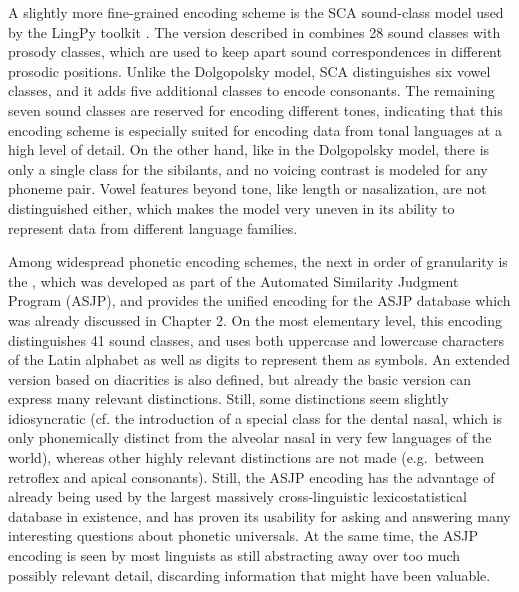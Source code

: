 A slightly more fine-grained encoding scheme is the SCA sound-class model used by the LingPy toolkit \citep{list_forkel_2016}. The version described in \cite{list2012sca} combines 28 sound classes with prosody classes, which are used to keep apart sound correspondences in different prosodic positions. Unlike the Dolgopolsky model, SCA distinguishes six vowel classes, and it adds five additional classes to encode consonants. The remaining seven sound classes are reserved for encoding different tones, indicating that this encoding scheme is especially suited for encoding data from tonal languages at a high level of detail. On the other hand, like in the Dolgopolsky model, there is only a single class for the sibilants, and no voicing contrast is modeled for any phoneme pair. Vowel features beyond tone, like length or nasalization, are not distinguished either, which makes the model very uneven in its ability to represent data from different language families.

Among widespread phonetic encoding schemes, the next in order of granularity is the , which was developed as part of the Automated Similarity Judgment Program (ASJP), and provides the unified encoding for the ASJP database which was already discussed in Chapter 2. On the most elementary level, this encoding distinguishes 41 sound classes, and uses both uppercase and lowercase characters of the Latin alphabet as well as digits to represent them as symbols. An extended version based on diacritics is also defined, but already the basic version can express many relevant distinctions. Still, some distinctions seem slightly idiosyncratic (cf. the introduction of a special class for the dental nasal, which is only phonemically distinct from the alveolar nasal in very few languages of the world), whereas other highly relevant distinctions are not made (e.g.\ between retroflex and apical consonants). Still, the ASJP encoding has the advantage of already being used by the largest massively cross-linguistic lexicostatistical database in existence, and has proven its usability for asking and answering many interesting questions about phonetic universals. At the same time, the ASJP encoding is seen by most linguists as still abstracting away over too much possibly relevant detail, discarding information that might have been valuable.

